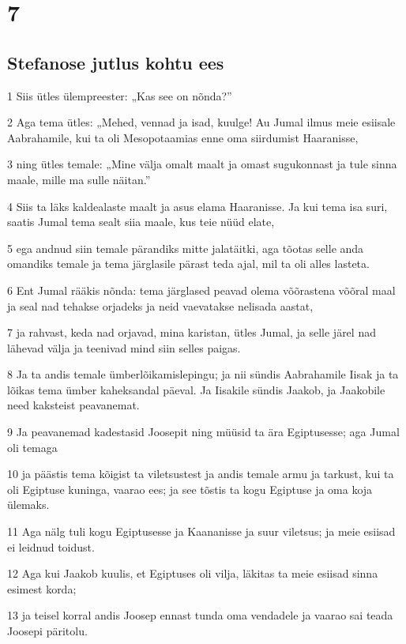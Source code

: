 \chapter{7}

\section*{Stefanose jutlus kohtu ees}

\par 1 Siis ütles ülempreester: „Kas see on nõnda?”
\par 2 Aga tema ütles: „Mehed, vennad ja isad, kuulge! Au Jumal ilmus meie esiisale Aabrahamile, kui ta oli Mesopotaamias enne oma siirdumist Haaranisse,
\par 3 ning ütles temale: „Mine välja omalt maalt ja omast sugukonnast ja tule sinna maale, mille ma sulle näitan.”
\par 4 Siis ta läks kaldealaste maalt ja asus elama Haaranisse. Ja kui tema isa suri, saatis Jumal tema sealt siia maale, kus teie nüüd elate,
\par 5 ega andnud siin temale pärandiks mitte jalatäitki, aga tõotas selle anda omandiks temale ja tema järglasile pärast teda ajal, mil ta oli alles lasteta.
\par 6 Ent Jumal rääkis nõnda: tema järglased peavad olema võõrastena võõral maal ja seal nad tehakse orjadeks ja neid vaevatakse nelisada aastat,
\par 7 ja rahvast, keda nad orjavad, mina karistan, ütles Jumal, ja selle järel nad lähevad välja ja teenivad mind siin selles paigas.
\par 8 Ja ta andis temale ümberlõikamislepingu; ja nii sündis Aabrahamile Iisak ja ta lõikas tema ümber kaheksandal päeval. Ja Iisakile sündis Jaakob, ja Jaakobile need kaksteist peavanemat.
\par 9 Ja peavanemad kadestasid Joosepit ning müüsid ta ära Egiptusesse; aga Jumal oli temaga
\par 10 ja päästis tema kõigist ta viletsustest ja andis temale armu ja tarkust, kui ta oli Egiptuse kuninga, vaarao ees; ja see tõstis ta kogu Egiptuse ja oma koja ülemaks.
\par 11 Aga nälg tuli kogu Egiptusesse ja Kaananisse ja suur viletsus; ja meie esiisad ei leidnud toidust.
\par 12 Aga kui Jaakob kuulis, et Egiptuses oli vilja, läkitas ta meie esiisad sinna esimest korda;
\par 13 ja teisel korral andis Joosep ennast tunda oma vendadele ja vaarao sai teada Joosepi päritolu.
